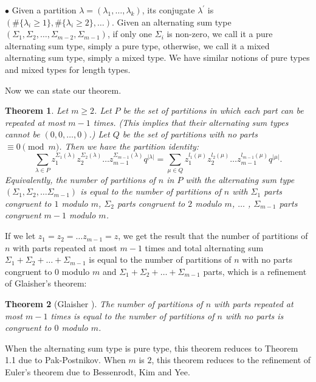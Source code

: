 \documentclass[11pt]{article}
\newtheorem{theorem}{Theorem}[section]
\begin{document}
$\bullet$ Given a partition $\lambda = (\lambda_1, \dots, \lambda_k)$, its conjugate $\lambda^\prime$ is $(\#\{\lambda_i \geq 1\},\#\{\lambda_i \geq 2\},\dots)$. Given an alternating sum type $(\Sigma_{1},\Sigma_{2}, \dots,\Sigma_{m-2}, \Sigma_{m-1})$, if only one $\Sigma_{i}$ is non-zero, we call it a pure alternating sum type, simply a pure type, otherwise, we call it a mixed alternating sum type, simply a mixed type. We have  similar notions of pure types and mixed types for length types.



Now we can state our theorem.
\begin{theorem}
Let $m\geq 2$. Let $P$ be the set of partitions in which each part can be repeated at most $m-1$ times. (This implies that their alternating sum types cannot be $(0,0,\dots,0)$.) Let $Q$ be the set of partitions with no parts $\equiv 0\pmod m$. Then we have the partition identity:
$$
\sum_{\lambda \in P} z_{1}^{\Sigma_{1}(\lambda)}  z_{2}^{\Sigma_{2}(\lambda)      }  \dots z_{m-1} ^{\Sigma_{m-1}(\lambda)          }  q^{|\lambda |}      =        \sum_{\mu \in Q} z_{1}^{l_{1}(\mu)}  z_{2}^{l_{2}(\mu)      }  \dots z_{m-1} ^{l_{m-1}(\mu)          }  q^{|\mu |}.   
 $$
Equivalently,  the number of partitions  of $n$ in $P$ with the alternating sum type $(\Sigma_{1}, \Sigma_{2}, \dots \Sigma_{m-1})$ is equal to the number of partitions of $n$ with $\Sigma_{1}$ parts congruent to $1$ modulo $m$, $\Sigma_{2}$ parts congruent to $2$ modulo $m$, $\dots$ , $\Sigma_{m-1}$ parts congruent $m-1$ modulo $m$.
\end{theorem}

If we let $z_{1}=z_{2}=\dots z_{m-1}=z$, we get the result that the number of partitions of $n$ with parts repeated at most $m-1$ times and total alternating sum $\Sigma_{1}+\Sigma_{2}+\dots +\Sigma_{m-1}$ is equal to the number of partitions of $n$ with no parts congruent to $0$ modulo $m$  and $\Sigma_{1}+\Sigma_{2}+\dots +\Sigma_{m-1}$ parts, which is a refinement of Glaisher's theorem:
\begin{theorem}[Glaisher \cite{Pak}]
The number of partitions of $n$ with parts repeated  at most $m-1$ times is equal to the number of partitions of $n$ with no parts is congruent to $0$ modulo $m$.
\end{theorem}
When the alternating sum type is pure type, this theorem reduces to Theorem 1.1 due to Pak-Postnikov. When $m$ is $2$, this theorem reduces to the refinement of Euler's theorem due to Bessenrodt, Kim and Yee.
\end{document}
